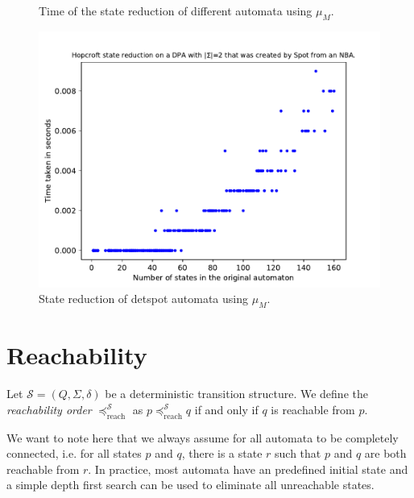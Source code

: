 \begin{figure}
\begin{minipage}{0.49\textwidth}
		\caption{Time of the state reduction of different automata using $\mu_M$.}
		\label{fig:general:empirical_moore_time}
	\end{minipage}
\end{figure}

\begin{figure}
	\centering
	\includegraphics[page=2,height=.4\textheight]{../data/analysis/hopcroft/detspot_ap1.pdf} 
	\caption{State reduction of \textsf{detspot} automata using $\mu_M$.}
	\label{fig:general:empirical_moore_reduct_abs}
\end{figure}



\vspace{5pt}





\section{Reachability}

\begin{defn}
	Let $\mathcal{S} = (Q, \Sigma, \delta)$ be a deterministic transition structure. We define the \emph{reachability order} $\preceq_\text{reach}^\mathcal{S}$ as $p \preceq_\text{reach}^\mathcal{S} q$ if and only if $q$ is reachable from $p$. 
\end{defn}

We want to note here that we always assume for all automata to be completely connected, i.e. for all states $p$ and $q$, there is a state $r$ such that $p$ and $q$ are both reachable from $r$. In practice, most automata have an predefined initial state and a simple depth first search can be used to eliminate all unreachable states.

